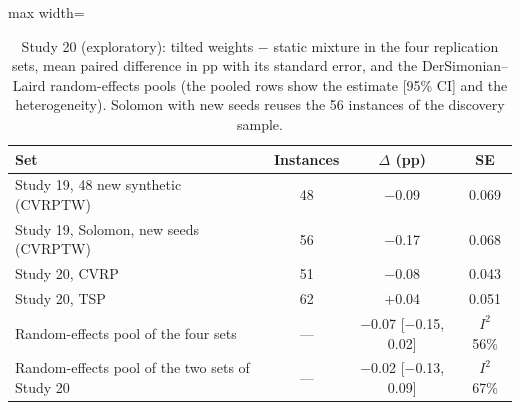 \begin{table}[t]
\caption{Study 20 (exploratory): tilted weights $-$ static mixture in the four replication sets, mean paired difference in pp with its standard error, and the DerSimonian--Laird random-effects pools (the pooled rows show the estimate [95\% CI] and the heterogeneity). Solomon with new seeds reuses the 56 instances of the discovery sample.}\label{tab:s20m}
\centering
\small
\begin{adjustbox}{max width=\linewidth}
\begin{tabular}{lccc}
\toprule
Set & Instances & $\Delta$ (pp) & SE \\
\midrule
Study 19, 48 new synthetic (CVRPTW) & 48 & $-$0.09 & 0.069 \\
Study 19, Solomon, new seeds (CVRPTW) & 56 & $-$0.17 & 0.068 \\
Study 20, CVRP & 51 & $-$0.08 & 0.043 \\
Study 20, TSP & 62 & $+$0.04 & 0.051 \\
Random-effects pool of the four sets & --- & $-$0.07 [$-$0.15, 0.02] & $I^2$ 56\% \\
Random-effects pool of the two sets of Study 20 & --- & $-$0.02 [$-$0.13, 0.09] & $I^2$ 67\% \\
\bottomrule
\end{tabular}
\end{adjustbox}
\end{table}
